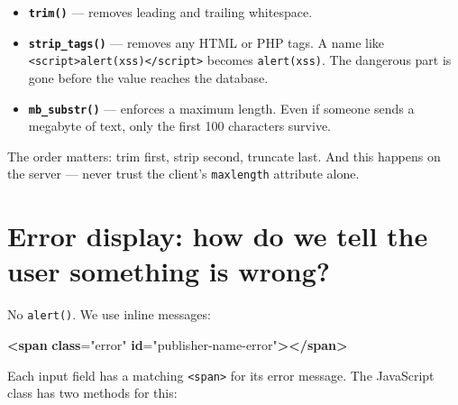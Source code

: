 \documentclass[11pt,a4paper,oneside]{book}
\newenvironment{Shaded}{\begin{snugshade}}{\end{snugshade}}
\newcommand{\KeywordTok}[1]{\textcolor[HTML]{007020}{\textbf{#1}}}
\newcommand{\StringTok}[1]{\textcolor[HTML]{4070A0}{#1}}
\newcommand{\OtherTok}[1]{\textcolor[HTML]{007020}{#1}}
\newcommand{\ErrorTok}[1]{\textcolor[HTML]{FF0000}{\textbf{#1}}}
\providecommand{\tightlist}{%
  \setlength{\itemsep}{0pt}\setlength{\parskip}{0pt}}
\begin{document}
\begin{itemize}
\tightlist
\item
  \textbf{\texttt{trim()}} --- removes leading and trailing
  whitespace.
\item
  \textbf{\texttt{strip\_tags()}} --- removes any HTML or PHP
  tags. A name like
  \texttt{\textless{}script\textgreater{}alert(\textquotesingle{}xss\textquotesingle{})\textless{}/script\textgreater{}}
  becomes
  \texttt{alert(\textquotesingle{}xss\textquotesingle{})}. The
  dangerous part is gone before the value reaches the database.
\item
  \textbf{\texttt{mb\_substr()}} --- enforces a maximum length.
  Even if someone sends a megabyte of text, only the first 100
  characters survive.
\end{itemize}

The order matters: trim first, strip second, truncate last. And
this happens on the server --- never trust the client's
\texttt{maxlength} attribute alone.

\hypertarget{error-display-how-do-we-tell-the-user-something-is-wrong}{%
\section{Error display: how do we tell the user something is
wrong?}\label{error-display-how-do-we-tell-the-user-something-is-wrong}}

No \texttt{alert()}. We use inline messages:

\begin{Shaded}
\begin{Highlighting}[]
\KeywordTok{\textless{}span} \ErrorTok{class}\OtherTok{=}\StringTok{"error"} \ErrorTok{id}\OtherTok{=}\StringTok{"publisher{-}name{-}error"}\KeywordTok{\textgreater{}\textless{}/span\textgreater{}}
\end{Highlighting}
\end{Shaded}

Each input field has a matching
\texttt{\textless{}span\textgreater{}} for its error message. The
JavaScript class has two methods for this:
\end{document}
